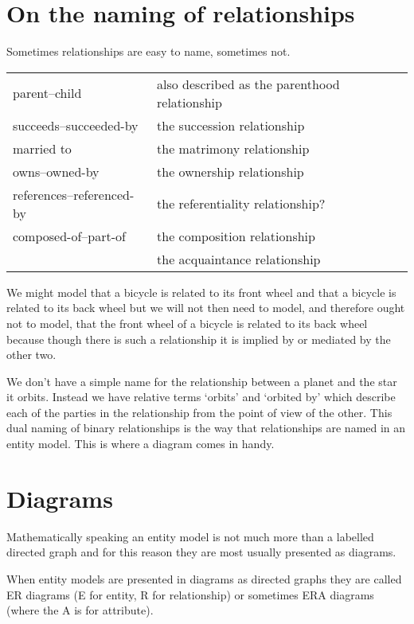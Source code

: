 \section{On the naming of relationships}

\mynote Sometimes relationships are easy to name, sometimes not. 

\begin{center}
\begin{tabular} {| l | p{9cm} |}
\hline
parent--child & also described as the parenthood relationship\\
succeeds--succeeded-by &  the succession relationship \\
married to             &  the matrimony relationship \\
owns--owned-by         & the ownership relationship\\
references--referenced-by & the referentiality relationship?\\
composed-of--part-of   &  the composition relationship\\
                       &  the acquaintance relationship\\
\hline
\end{tabular} 
\end{center}

\mynote We might model that a bicycle is related to its front wheel and that a bicycle is related to its back wheel but we will not then need to model,  and therefore ought not to model, that the front wheel of a bicycle is related to its back wheel because though there is such a relationship it is implied by or mediated by the other two.  

\mynote 
We don't have a simple name for the relationship between a planet and the star it orbits. Instead we have  relative terms `orbits' and `orbited by' which describe each of the parties in the relationship from the point of view of the other. This dual naming of binary relationships is the way that relationships are named in an entity model. 
This is where a diagram comes in handy.

\section{Diagrams}
  
\mynote Mathematically speaking an entity model is not much more than a labelled directed graph and for this reason they are most usually presented as diagrams.

\mynote When entity models are presented in diagrams as directed graphs
they are called ER diagrams (E for entity, R for relationship) or sometimes
ERA diagrams (where the A is for attribute). 



